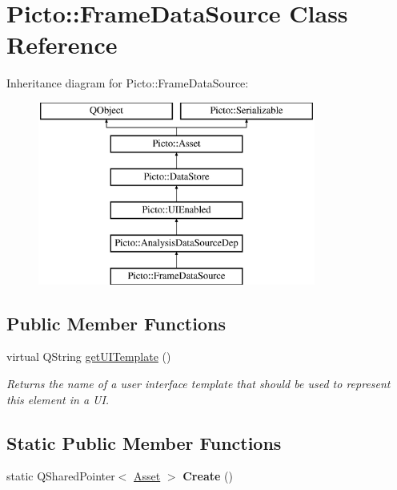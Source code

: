 \hypertarget{class_picto_1_1_frame_data_source}{\section{Picto\-:\-:Frame\-Data\-Source Class Reference}
\label{class_picto_1_1_frame_data_source}
}
Inheritance diagram for Picto\-:\-:Frame\-Data\-Source\-:\begin{figure}[H]
\begin{center}
\leavevmode
\includegraphics[height=6.000000cm]{class_picto_1_1_frame_data_source}
\end{center}
\end{figure}
\subsection*{Public Member Functions}
\begin{DoxyCompactItemize}
\item 
\hypertarget{class_picto_1_1_frame_data_source_a0437659808afe9f35f69555c56591c9f}{virtual Q\-String \hyperlink{class_picto_1_1_frame_data_source_a0437659808afe9f35f69555c56591c9f}{get\-U\-I\-Template} ()}\label{class_picto_1_1_frame_data_source_a0437659808afe9f35f69555c56591c9f}

\begin{DoxyCompactList}\small\item\em Returns the name of a user interface template that should be used to represent this element in a U\-I. \end{DoxyCompactList}\end{DoxyCompactItemize}
\subsection*{Static Public Member Functions}
\begin{DoxyCompactItemize}
\item 
\hypertarget{class_picto_1_1_frame_data_source_aff9a5feedeff6092bf441d61f538f8ab}{static Q\-Shared\-Pointer$<$ \hyperlink{class_picto_1_1_asset}{Asset} $>$ {\bfseries Create} ()}\label{class_picto_1_1_frame_data_source_aff9a5feedeff6092bf441d61f538f8ab}

\end{DoxyCompactItemize}
